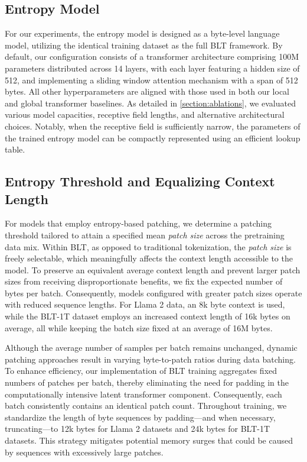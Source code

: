 \subsection{Entropy Model} For our experiments, the entropy model is designed as a byte-level language model, utilizing the identical training dataset as the full {\textsc BLT} framework. By default, our configuration consists of a transformer architecture comprising 100M parameters distributed across 14 layers, with each layer featuring a hidden size of 512, and implementing a sliding window attention mechanism with a span of 512 bytes. All other hyperparameters are aligned with those used in both our local and global transformer baselines. As detailed in \autoref{section:ablations}, we evaluated various model capacities, receptive field lengths, and alternative architectural choices. Notably, when the receptive field is sufficiently narrow, the parameters of the trained entropy model can be compactly represented using an efficient lookup table.

\subsection{Entropy Threshold and Equalizing Context Length} For models that employ entropy-based patching, we determine a patching threshold tailored to attain a specified mean \textit{patch size} across the pretraining data mix. Within {\textsc BLT}, as opposed to traditional tokenization, the \textit{patch size} is freely selectable, which meaningfully affects the context length accessible to the model. To preserve an equivalent average context length and prevent larger patch sizes from receiving disproportionate benefits, we fix the expected number of bytes per batch. Consequently, models configured with greater patch sizes operate with reduced sequence lengths. For Llama 2 data, an 8k byte context is used, while the {\textsc BLT}-1T dataset employs an increased context length of 16k bytes on average, all while keeping the batch size fixed at an average of 16M bytes.

Although the average number of samples per batch remains unchanged, dynamic patching approaches result in varying byte-to-patch ratios during data batching. To enhance efficiency, our implementation of {\textsc BLT} training aggregates fixed numbers of patches per batch, thereby eliminating the need for padding in the computationally intensive latent transformer component. Consequently, each batch consistently contains an identical patch count. Throughout training, we standardize the length of byte sequences by padding—and when necessary, truncating—to 12k bytes for Llama 2 datasets and 24k bytes for {\textsc BLT}-1T datasets. This strategy mitigates potential memory surges that could be caused by sequences with excessively large patches.

